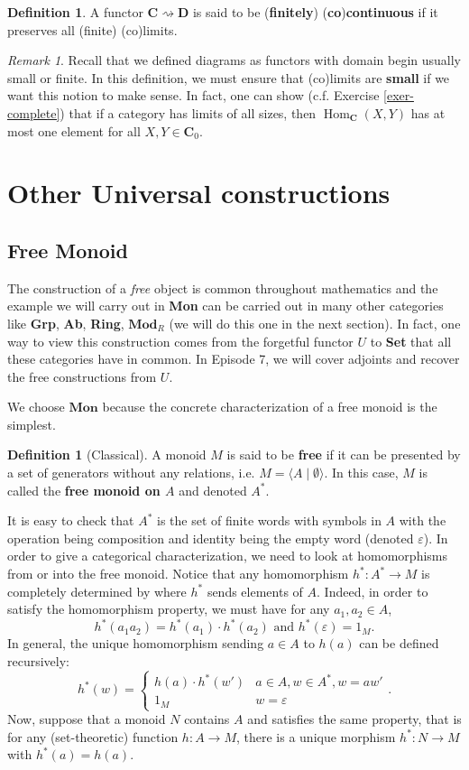 \documentclass{article}
\theoremstyle{definition}
\newtheorem{defn}[thm]{Definition}
\theoremstyle{remark}
\newtheorem{rem}[thm]{Remark}
\DeclareMathOperator{\Hom}{Hom}
\begin{document}
\begin{defn}
    A functor $\mathbf{C} \rightsquigarrow \mathbf{D}$ is said to be (\textbf{finitely}) (\textbf{co})\textbf{continuous} if it preserves all (finite) (co)limits.
\end{defn}
\begin{rem}
    Recall that we defined diagrams as functors with domain begin usually small or finite. In this definition, we must ensure that (co)limits are \textbf{small} if we want this notion to make sense. In fact, one can show (c.f. Exercise \ref{exer-complete}) that if a category has limits of all sizes, then $\Hom_{\mathbf{C}}(X,Y)$ has at most one element for all $X,Y \in \mathbf{C}_0$.
\end{rem}

\section{Other Universal constructions}

\subsection{Free Monoid}
The construction of a \textit{free} object is common throughout mathematics and the example we will carry out in \textbf{Mon} can be carried out in many other categories like \textbf{Grp}, \textbf{Ab}, \textbf{Ring}, $\textbf{Mod}_R$ (we will do this one in the next section). In fact, one way to view this construction comes from the forgetful functor $U$ to \textbf{Set} that all these categories have in common. In Episode 7, we will cover adjoints and recover the free constructions from $U$.

We choose $\textbf{Mon}$ because the concrete characterization of a free monoid is the simplest.
\begin{defn}[Classical]
    A monoid $M$ is said to be \textbf{free} if it can be presented by a set of generators without any relations, i.e. $M = \langle A \mid \emptyset \rangle$. In this case, $M$ is called the \textbf{free monoid on $A$} and denoted $A^*$.
\end{defn}
It is easy to check that $A^*$ is the set of finite words with symbols in $A$ with the operation being composition and identity being the empty word (denoted $\varepsilon$). In order to give a categorical characterization, we need to look at homomorphisms from or into the free monoid. Notice that any homomorphism $h^*:A^* \rightarrow M$ is completely determined by where $h^*$ sends elements of $A$. Indeed, in order to satisfy the homomorphism property, we must have for any $a_1, a_2 \in A$, \[h^*(a_1a_2) = h^*(a_1)\cdot h^*(a_2) \text{ and } h^*(\varepsilon) = 1_M.\] In general, the unique homomorphism sending $a \in A$ to $h(a)$ can be defined recursively:
\[h^*(w) = \begin{cases}
    h(a)\cdot h^*(w') &a \in A, w \in A^*, w = aw'\\
    1_M &w = \varepsilon\end{cases}.\]
Now, suppose that a monoid $N$ contains $A$ and satisfies the same property, that is for any (set-theoretic) function $h:A \rightarrow M$, there is a unique morphism $h^*:N \rightarrow M$ with $h^*(a) = h(a)$. 
\end{document}
